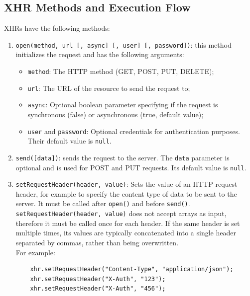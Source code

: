 \documentclass{scrbook}
\begin{document}
	\subsection{XHR Methods and Execution Flow}
	
	XHRs have the following methods:
	
	\begin{enumerate}
		\item \texttt{open(method, url [, async] [, user] [, password])}: this method initializes the request and has the following arguments:
		\begin{itemize}
			\item \texttt{method}: The HTTP method (GET, POST, PUT, DELETE);
			
			\item \texttt{url}: The URL of the resource to send the request to;
			
			\item \texttt{async}: Optional boolean parameter specifying if the request is synchronous (false) or asynchronous (true, default value);
			
			\item \texttt{user} and \texttt{password}: Optional credentials for authentication purposes. Their default value is \texttt{null}.
		\end{itemize}
		
		\item \texttt{send([data])}: sends the request to the server. The \texttt{data} parameter is optional and is used for POST and PUT requests. Its default value is \texttt{null}.
		
		\item \texttt{setRequestHeader(header, value)}: Sets the value of an HTTP request header, for example to specify the content type of data to be sent to the server.
		It must be called after \texttt{open()} and before \texttt{send()}. \texttt{setRequestHeader(header, value)} does not accept arrays as input, therefore it must be called once for each header. If the same header is set multiple times, its values are typically concatenated into a single header separated by commas, rather than being overwritten.\\
		
		For example:
		
	\begin{lstlisting}
	xhr.setRequestHeader("Content-Type", "application/json");
	xhr.setRequestHeader("X-Auth", "123");
	xhr.setRequestHeader("X-Auth", "456");
	\end{lstlisting}
		

\end{enumerate}
\end{document}
